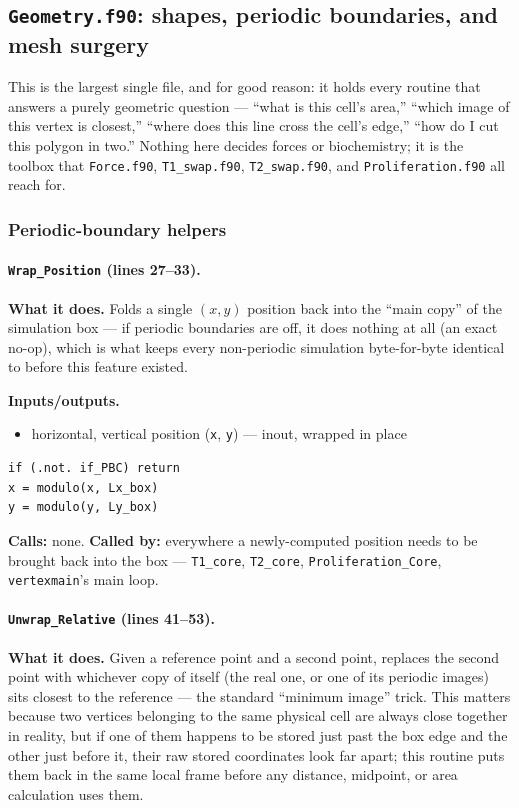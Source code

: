 \documentclass[11pt]{article}
\begin{document}
\subsection{\texttt{Geometry.f90}: shapes, periodic boundaries, and mesh surgery}
\label{sec:codegeometry}

This is the largest single file, and for good reason: it holds every routine that
answers a purely geometric question --- ``what is this cell's area,'' ``which image of
this vertex is closest,'' ``where does this line cross the cell's edge,'' ``how do I cut
this polygon in two.'' Nothing here decides forces or biochemistry; it is the toolbox
that \texttt{Force.f90}, \texttt{T1\_swap.f90}, \texttt{T2\_swap.f90}, and
\texttt{Proliferation.f90} all reach for.

\subsubsection*{Periodic-boundary helpers}

\paragraph{\texttt{Wrap\_Position} (lines 27--33).}
\textbf{What it does.} Folds a single $(x,y)$ position back into the ``main copy'' of
the simulation box --- if periodic boundaries are off, it does nothing at all (an exact
no-op), which is what keeps every non-periodic simulation byte-for-byte identical to
before this feature existed.

\textbf{Inputs/outputs.}
\begin{itemize}[nosep]
  \item horizontal, vertical position (\texttt{x}, \texttt{y}) --- inout, wrapped in place
\end{itemize}

\begin{lstlisting}[caption={The complete body of \texttt{Wrap\_Position}.}]
if (.not. if_PBC) return
x = modulo(x, Lx_box)
y = modulo(y, Ly_box)
\end{lstlisting}

\textbf{Calls:} none. \textbf{Called by:} everywhere a newly-computed position needs to
be brought back into the box --- \texttt{T1\_core}, \texttt{T2\_core},
\texttt{Proliferation\_Core}, \texttt{vertexmain}'s main loop.

\paragraph{\texttt{Unwrap\_Relative} (lines 41--53).}
\textbf{What it does.} Given a reference point and a second point, replaces the second
point with whichever copy of itself (the real one, or one of its periodic images) sits
closest to the reference --- the standard ``minimum image'' trick. This matters because
two vertices belonging to the same physical cell are always close together in reality,
but if one of them happens to be stored just past the box edge and the other just
before it, their raw stored coordinates look far apart; this routine puts them back in
the same local frame before any distance, midpoint, or area calculation uses them.
\end{document}
